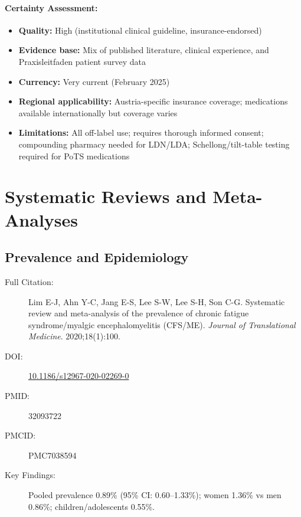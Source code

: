 \paragraph{Certainty Assessment:}
\begin{itemize}
    \item \textbf{Quality:} High (institutional clinical guideline, insurance-endorsed)
    \item \textbf{Evidence base:} Mix of published literature, clinical experience, and Praxisleitfaden patient survey data
    \item \textbf{Currency:} Very current (February 2025)
    \item \textbf{Regional applicability:} Austria-specific insurance coverage; medications available internationally but coverage varies
    \item \textbf{Limitations:} All off-label use; requires thorough informed consent; compounding pharmacy needed for LDN/LDA; Schellong/tilt-table testing required for PoTS medications
\end{itemize}

\section{Systematic Reviews and Meta-Analyses}
\label{sec:bib-systematic-reviews}

\subsection{Prevalence and Epidemiology}

\begin{description}
    \item[Full Citation:] Lim E-J, Ahn Y-C, Jang E-S, Lee S-W, Lee S-H, Son C-G. Systematic review and meta-analysis of the prevalence of chronic fatigue syndrome/myalgic encephalomyelitis (CFS/ME). \textit{Journal of Translational Medicine}. 2020;18(1):100.
    \item[DOI:] \href{https://doi.org/10.1186/s12967-020-02269-0}{10.1186/s12967-020-02269-0}
    \item[PMID:] 32093722
    \item[PMCID:] PMC7038594
    \item[Key Findings:] Pooled prevalence 0.89\% (95\% CI: 0.60--1.33\%); women 1.36\% vs men 0.86\%; children/adolescents 0.55\%.
\end{description}

